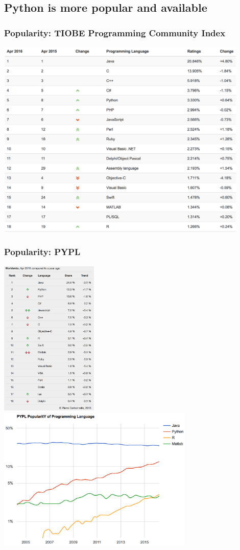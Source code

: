 \documentclass[compress]{beamer}
\begin{document}
\subsection{Python is more popular and available}
\begin{frame}
	\frametitle{Popularity: TIOBE Programming Community Index}
	\centering
	\includegraphics[width=0.9\textwidth]{fig/TIOBE}
\end{frame}

\begin{frame}
	\frametitle{Popularity: PYPL}
	\centering
	\includegraphics[width=0.35\textwidth]{fig/PYPL}
	\includegraphics[width=0.7\textwidth]{fig/PYPL_trend}
\end{frame}
\end{document}
